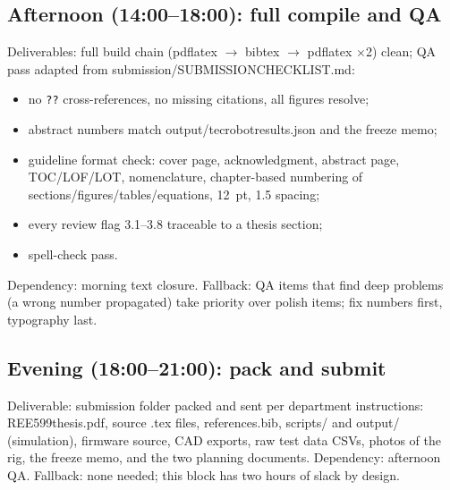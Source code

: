 \documentclass[11pt,a4paper]{article}
\newcommand{\f}[1]{{\ttfamily\def\_{\textunderscore\allowbreak}#1}}
\begin{document}
\subsection*{Afternoon (14:00--18:00): full compile and QA}
Deliverables: full build chain
(\f{pdflatex} $\to$ \f{bibtex} $\to$ \f{pdflatex} $\times$2) clean; QA pass
adapted from \f{submission/SUBMISSION\_CHECKLIST.md}:
\begin{itemize}[nosep,leftmargin=*]
  \item no \texttt{??} cross-references, no missing citations, all figures
        resolve;
  \item abstract numbers match \f{output/tec\_robot\_results.json} and the
        freeze memo;
  \item guideline format check: cover page, acknowledgment, abstract page,
        TOC/LOF/LOT, nomenclature, chapter-based numbering of
        sections/figures/tables/equations, 12~pt, 1.5 spacing;
  \item every review flag 3.1--3.8 traceable to a thesis section;
  \item spell-check pass.
\end{itemize}
Dependency: morning text closure. Fallback: QA items that find deep problems
(a wrong number propagated) take priority over polish items; fix numbers
first, typography last.

\subsection*{Evening (18:00--21:00): pack and submit}
Deliverable: submission folder packed and sent per department instructions:
\f{REE599\_thesis.pdf}, source \f{.tex} files, \f{references.bib},
\f{scripts/} and \f{output/} (simulation), firmware source, CAD exports, raw
test data CSVs, photos of the rig, the freeze memo, and the two planning
documents. Dependency: afternoon QA. Fallback: none needed; this block has
two hours of slack by design.

\end{document}
